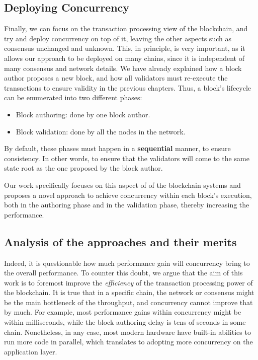 \subsection{Deploying Concurrency}

Finally, we can focus on the transaction processing view of the blockchain, and try and deploy
concurrency on top of it, leaving the other aspects such as consensus unchanged and unknown. This,
in principle, is very important, as it allows our approach to be deployed on many chains, since it
is independent of many consensus and network details. We have already explained how a block author
proposes a new block, and how all validators must re-execute the transactions to ensure validity in
the previous chapters. Thus, a block's lifecycle can be enumerated into two different phases:

\begin{itemize}
	\item Block authoring: done by one block author.
	\item Block validation: done by all the nodes in the network.
\end{itemize}

By default, these phases must happen in a \textbf{sequential} manner, to ensure consistency.
In other words, to ensure that the validators will come to the same state root as the one proposed
by the block author.

Our work specifically focuses on this aspect of of the blockchain systems and proposes a novel
approach to achieve concurrency within each block's execution, both in the authoring phase and in
the validation phase, thereby increasing the performance.


\subsection{Analysis of the approaches and their merits} \label{chap_bg:subsec:summary_speedup}
Indeed, it is questionable how much performance gain will concurrency bring to the overall
performance. To counter this doubt, we argue that the aim of this work is to foremost improve the
\textit{efficiency} of the transaction processing power of the blockchain. It is true that in a specific
chain, the network or consensus might be the main bottleneck of the throughput, and concurrency
cannot improve that by much. For example, most performance gains within concurrency might be within
milliseconds, while the block authoring delay is tens of seconds in some chain. Nonetheless, in any
case, most modern hardware have built-in abilities to run more code in parallel, which translates to
adopting more concurrency on the application layer.

